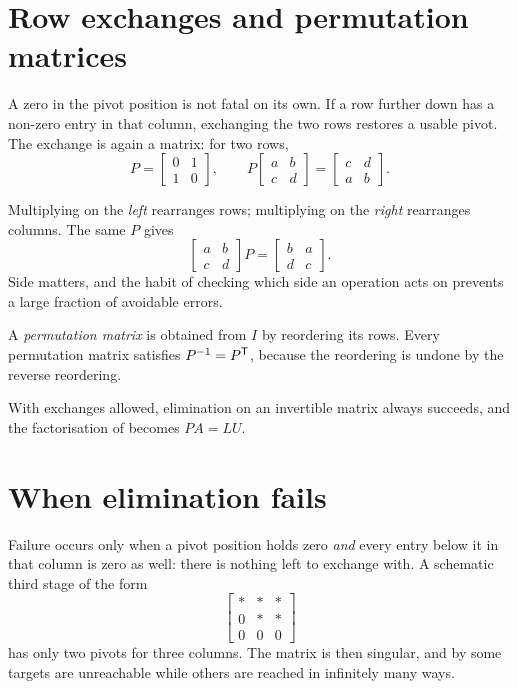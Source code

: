 \section{Row exchanges and permutation matrices}

A zero in the pivot position is not fatal on its own. If a row further down has
a non-zero entry in that column, exchanging the two rows restores a usable
pivot. The exchange is again a matrix: for two rows,
\[
	P=\begin{bmatrix}0&1\\1&0\end{bmatrix},
	\qquad
	P\begin{bmatrix}a&b\\c&d\end{bmatrix}=\begin{bmatrix}c&d\\a&b\end{bmatrix}.
\]

\begin{remark}
Multiplying on the \emph{left} rearranges rows; multiplying on the \emph{right}
rearranges columns. The same \(P\) gives
\[
	\begin{bmatrix}a&b\\c&d\end{bmatrix}P=\begin{bmatrix}b&a\\d&c\end{bmatrix}.
\]
Side matters, and the habit of checking which side an operation acts on prevents
a large fraction of avoidable errors.
\end{remark}

\begin{definition}
A \emph{permutation matrix} is obtained from \(I\) by reordering its rows. Every
permutation matrix satisfies \(P^{-1}=P^{\mathsf{T}}\), because the reordering is undone
by the reverse reordering.
\end{definition}

With exchanges allowed, elimination on an invertible matrix always succeeds, and
the factorisation of  becomes \(PA=LU\).

\section{When elimination fails}

Failure occurs only when a pivot position holds zero \emph{and} every entry
below it in that column is zero as well: there is nothing left to exchange with.
A schematic third stage of the form
\[
	\begin{bmatrix}\ast&\ast&\ast\\ 0&\ast&\ast\\ 0&0&0\end{bmatrix}
\]
has only two pivots for three columns. The matrix is then singular, and by
 some targets are unreachable while others are reached in
infinitely many ways.


